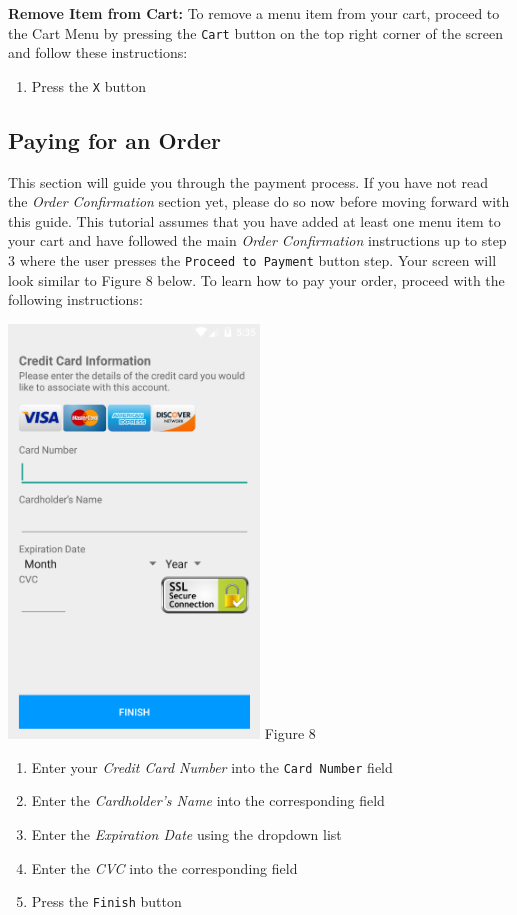 \documentclass[12pt, titlepage]{article}
\begin{document}
		\textbf{Remove Item from Cart:}
	To remove a menu item from your cart, proceed to the Cart Menu by pressing the \texttt{Cart} button on the top right corner of the screen and follow these instructions:
	
	\begin{enumerate}
		\item Press the \texttt{X} button
	\end{enumerate}

\subsection{Paying for an Order}
This section will guide you through the payment process. If you have not read the \emph{Order Confirmation} section yet, please do so now before moving forward with this guide. This tutorial assumes that you have added at least one menu item to your cart and have followed the main \emph{Order Confirmation} instructions up to step 3 where the user presses the \texttt{Proceed to Payment} button step. Your screen will look similar to Figure 8 below. To learn how to pay your order, proceed with the following instructions:

	\begin{center}
		\includegraphics[width=0.5\textwidth]{cc.png}
		\linebreak Figure 8
	\end{center}
	\begin{enumerate}
		\item Enter your \emph{Credit Card Number} into the \texttt{Card 				Number}	field
		\item Enter the \emph{Cardholder's Name} into the corresponding 				field
		\item Enter the \emph{Expiration Date} using the dropdown list
		\item Enter the \emph{CVC} into the corresponding field
		\item Press the \texttt{Finish} button
	\end{enumerate}
\end{document}
